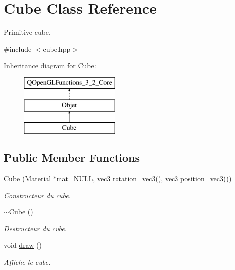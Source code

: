 \hypertarget{class_cube}{\section{Cube Class Reference}
\label{class_cube}
}


Primitive cube.  




{\ttfamily \#include $<$cube.\+hpp$>$}

Inheritance diagram for Cube\+:\begin{figure}[H]
\begin{center}
\leavevmode
\includegraphics[height=3.000000cm]{class_cube}
\end{center}
\end{figure}
\subsection*{Public Member Functions}
\begin{DoxyCompactItemize}
\item 
\hyperlink{class_cube_a6d016e01f3fee45cff97be27ff7175d8}{Cube} (\hyperlink{class_material}{Material} $\ast$mat=N\+U\+L\+L, \hyperlink{structvec3}{vec3} \hyperlink{class_objet_ac69a1b459bcb4433099c8cfbff06b209}{rotation}=\hyperlink{structvec3}{vec3}(), \hyperlink{structvec3}{vec3} \hyperlink{class_objet_a0e109bc790b14328202dd2546b04e2fd}{position}=\hyperlink{structvec3}{vec3}())
\begin{DoxyCompactList}\small\item\em Constructeur du cube. \end{DoxyCompactList}\item 
\hyperlink{class_cube_aa814e979cecb8c451fdb332ded2cea1e}{$\sim$\+Cube} ()
\begin{DoxyCompactList}\small\item\em Destructeur du cube. \end{DoxyCompactList}\item 
void \hyperlink{class_cube_ab26b72a81376fd5dc4fcc7f0b715b087}{draw} ()
\begin{DoxyCompactList}\small\item\em Affiche le cube. \end{DoxyCompactList}\end{DoxyCompactItemize}
